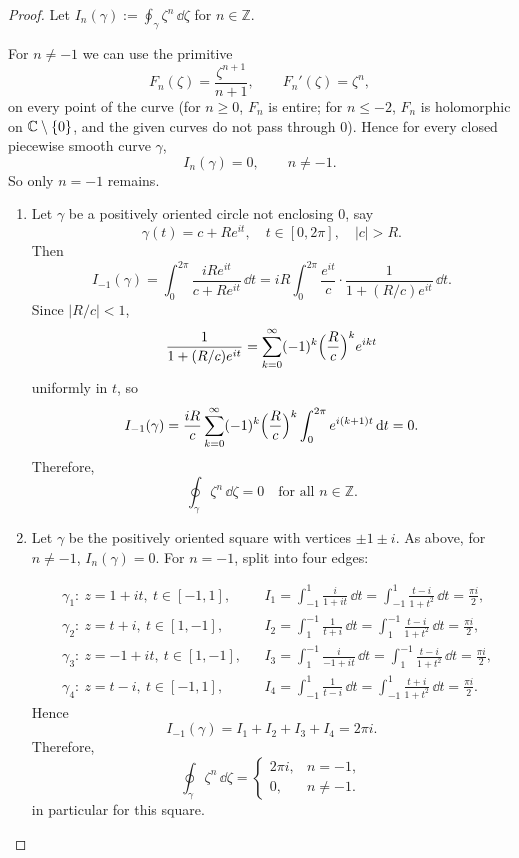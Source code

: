 \documentclass{article}
\begin{document}
\begin{proof}
  Let $I_n(\gamma):=\oint_\gamma \zeta^n\,\dd\zeta$ for $n\in\mathbb{Z}$.

  For $n\neq -1$ we can use the primitive
  \[
    F_n(\zeta)=\frac{\zeta^{n+1}}{n+1},\qquad F_n'(\zeta)=\zeta^n,
  \]
  on every point of the curve (for $n\ge 0$, $F_n$ is entire; for
    $n\le -2$, $F_n$ is holomorphic on $\mathbb{C}\setminus\{0\}$, and the
  given curves do not pass through $0$). Hence for every closed
  piecewise smooth curve $\gamma$,
  \[
    I_n(\gamma)=0,\qquad n\neq -1.
  \]
  So only $n=-1$ remains.

  \begin{enumerate}
    \item[(a)] Let $\gamma$ be a positively oriented circle not enclosing
      $0$, say
      \[
        \gamma(t)=c+Re^{it},\quad t\in[0,2\pi],\quad |c|>R.
      \]
      Then
      \[
        I_{-1}(\gamma)
        =\int_0^{2\pi}\frac{iRe^{it}}{c+Re^{it}}\,\dd t
        =iR\int_0^{2\pi}\frac{e^{it}}{c}\cdot\frac{1}{1+(R/c)e^{it}}\,\dd t.
      \]
      Since $|R/c|<1$,
      \[
        \frac{1}{1+(R/c)e^{it}}=\sum_{k=0}^{\infty}(-1)^k\Bigl(\frac{R}{c}\Bigr)^k
        e^{ikt}
      \]
      uniformly in $t$, so
      \[
        I_{-1}(\gamma)
        =\frac{iR}{c}\sum_{k=0}^{\infty}(-1)^k\Bigl(\frac{R}{c}\Bigr)^k
        \int_0^{2\pi}e^{i(k+1)t}\,\mathrm{d} t=0.
      \]
      Therefore,
      \[
        \oint_\gamma \zeta^n\,\dd\zeta=0\quad\text{for all }n\in\mathbb{Z}.
      \]

    \item[(b)] Let $\gamma$ be the positively oriented square with vertices
      $\pm1\pm i$. As above, for $n\neq -1$, $I_n(\gamma)=0$. For
      $n=-1$, split into four edges:

      \[
        \begin{aligned}
          &\gamma_1:\ z=1+it,\ t\in[-1,1],
          &&I_1=\int_{-1}^{1}\frac{i}{1+it}\,\dd t
          =\int_{-1}^{1}\frac{t-i}{1+t^2}\,\dd t=\frac{\pi i}{2},\\
          &\gamma_2:\ z=t+i,\ t\in[1,-1],
          &&I_2=\int_{1}^{-1}\frac{1}{t+i}\,\dd t
          =\int_{1}^{-1}\frac{t-i}{1+t^2}\,\dd t=\frac{\pi i}{2},\\
          &\gamma_3:\ z=-1+it,\ t\in[1,-1],
          &&I_3=\int_{1}^{-1}\frac{i}{-1+it}\,\dd t
          =\int_{1}^{-1}\frac{t-i}{1+t^2}\,\dd t=\frac{\pi i}{2},\\
          &\gamma_4:\ z=t-i,\ t\in[-1,1],
          &&I_4=\int_{-1}^{1}\frac{1}{t-i}\,\dd t
          =\int_{-1}^{1}\frac{t+i}{1+t^2}\,\dd t=\frac{\pi i}{2}.
        \end{aligned}
      \]
      Hence
      \[
        I_{-1}(\gamma)=I_1+I_2+I_3+I_4=2\pi i.
      \]
      Therefore,
      \[
        \oint_\gamma \zeta^n\,\dd\zeta=
        \begin{cases}
          2\pi i, & n=-1,\\
          0, & n\neq -1.
        \end{cases}
      \]
      in particular for this square.
  \end{enumerate}
\end{proof}
\end{document}
